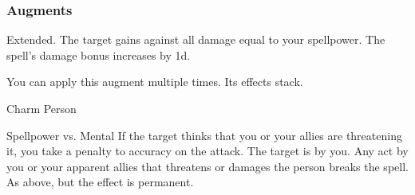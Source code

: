 \subsubsection{Augments}
 Extended.
The target gains  against all damage equal to your spellpower.
The spell's damage bonus increases by \plus1d.
\par
You can apply this augment multiple times.
Its effects stack.
\begin{spellsection}{Charm Person}
\begin{spellheader}
\end{spellheader}
\begin{spellcontent}
\begin{spelltargetinginfo}
\end{spelltargetinginfo}
\begin{spelleffects}
\begin{spellattack}{Spellpower vs. Mental}
\spellspecial If the target thinks that you or your allies are threatening it, you take a  penalty to accuracy on the attack.
\spellsuccess The target is \charmed by you. Any act by you or your apparent allies that threatens or damages the  person breaks the spell.
\spellcritical As above, but the effect is permanent.
\end{spellattack}
\end{spelleffects}
\end{spellcontent}
\begin{spellfooter}
\miscastexplode
\end{spellfooter}
\end{spellsection}
